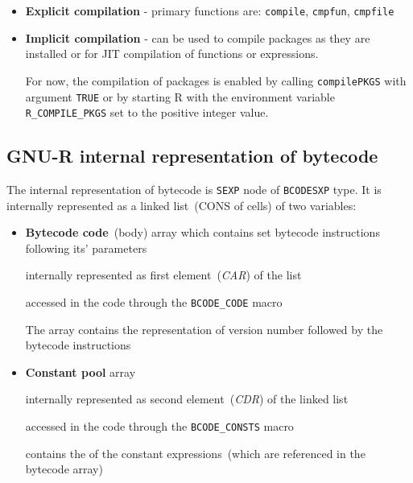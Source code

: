 \documentclass[thesis=M,english]{FITthesis}[2018/10/20]
\newcommand{\code}[1]{\texttt{#1}}
\begin{document}
\begin{itemize}
  \item \textbf{Explicit compilation} - primary functions are: \code{compile}, \code{cmpfun}, \code{cmpfile}
  \item \textbf{Implicit compilation} - can be used to compile packages as they are installed or for JIT compilation of functions or expressions.

For now, the compilation of packages is enabled by calling \code{compilePKGS} with argument \code{TRUE} or by starting R with the environment variable \code{R{\_}COMPILE{\_}PKGS} set to the positive integer value.
\end{itemize}


\subsection{GNU-R internal representation of bytecode}\label{R-internal-bc-representation}

The internal representation of bytecode is \code{SEXP} node of \code{BCODESXP} type. It is internally represented as a linked list~(CONS of cells) of two variables:
\begin{itemize}
	\item \textbf{Bytecode code}~(body) array which contains set bytecode instructions following its' parameters

		\hspace*{6mm} internally represented as first element~(\textit{CAR}) of the list

		\hspace*{6mm} accessed in the code through the \code{BCODE{\_}CODE} macro

		\hspace*{6mm} The array contains the representation of version number followed by the bytecode instructions

	\item \textbf{Constant pool} array

		\hspace*{6mm} internally represented as second element~(\textit{CDR}) of the linked list

		\hspace*{6mm} accessed in the code through the \code{BCODE{\_}CONSTS} macro

		\hspace*{6mm} contains the of the constant expressions~(which are referenced in the bytecode array)

\end{itemize}
\end{document}
